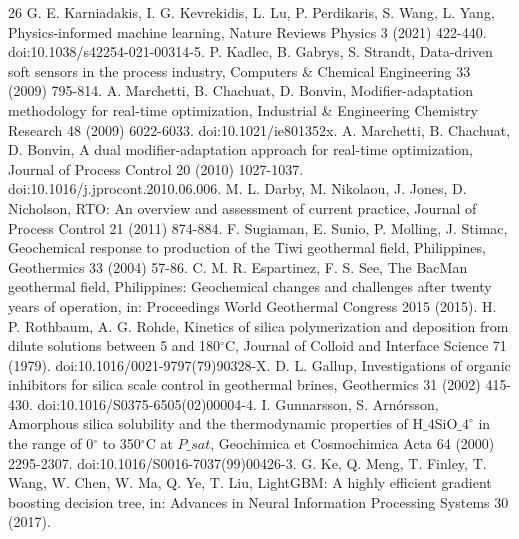\documentclass[review,number,sort&compress]{elsarticle}
\begin{document}
\begin{thebibliography}{26}
 G. E. Karniadakis, I. G. Kevrekidis, L. Lu, P. Perdikaris, S. Wang, L. Yang, Physics-informed machine learning, Nature Reviews Physics 3 (2021) 422-440. doi:10.1038/s42254-021-00314-5.
 P. Kadlec, B. Gabrys, S. Strandt, Data-driven soft sensors in the process industry, Computers \& Chemical Engineering 33 (2009) 795-814.
 A. Marchetti, B. Chachuat, D. Bonvin, Modifier-adaptation methodology for real-time optimization, Industrial \& Engineering Chemistry Research 48 (2009) 6022-6033. doi:10.1021/ie801352x.
 A. Marchetti, B. Chachuat, D. Bonvin, A dual modifier-adaptation approach for real-time optimization, Journal of Process Control 20 (2010) 1027-1037. doi:10.1016/j.jprocont.2010.06.006.
 M. L. Darby, M. Nikolaou, J. Jones, D. Nicholson, RTO: An overview and assessment of current practice, Journal of Process Control 21 (2011) 874-884.
 F. Sugiaman, E. Sunio, P. Molling, J. Stimac, Geochemical response to production of the Tiwi geothermal field, Philippines, Geothermics 33 (2004) 57-86.
 C. M. R. Espartinez, F. S. See, The BacMan geothermal field, Philippines: Geochemical changes and challenges after twenty years of operation, in: Proceedings World Geothermal Congress 2015 (2015).
 H. P. Rothbaum, A. G. Rohde, Kinetics of silica polymerization and deposition from dilute solutions between 5 and 180$^\circ$C, Journal of Colloid and Interface Science 71 (1979). doi:10.1016/0021-9797(79)90328-X.
 D. L. Gallup, Investigations of organic inhibitors for silica scale control in geothermal brines, Geothermics 31 (2002) 415-430. doi:10.1016/S0375-6505(02)00004-4.
 I. Gunnarsson, S. Arn\'orsson, Amorphous silica solubility and the thermodynamic properties of H$\_4$SiO$\_4^\circ$ in the range of 0$^\circ$ to 350$^\circ$C at $P\_sat$, Geochimica et Cosmochimica Acta 64 (2000) 2295-2307. doi:10.1016/S0016-7037(99)00426-3.
 G. Ke, Q. Meng, T. Finley, T. Wang, W. Chen, W. Ma, Q. Ye, T. Liu, LightGBM: A highly efficient gradient boosting decision tree, in: Advances in Neural Information Processing Systems 30 (2017).

\end{thebibliography}
\end{document}
